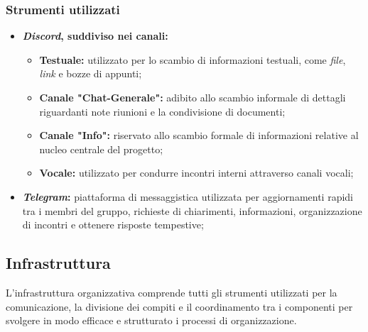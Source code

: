 \documentclass[5pt]{article}
\begin{document}
\subsubsection{Strumenti utilizzati}

\begin{itemize}
	\item \textbf{\textit{\textbf{Discord}}, suddiviso nei canali:}
	\begin{itemize}
		\item \textbf{Testuale:} utilizzato per lo scambio di informazioni testuali, come \textit{file}, \textit{link} e bozze di appunti;
		\item \textbf{Canale "Chat-Generale":} adibito allo scambio informale di dettagli riguardanti note riunioni e la condivisione di documenti;
		\item \textbf{Canale "Info":} riservato allo scambio formale di informazioni relative al nucleo centrale del progetto;
		\item \textbf{Vocale:} utilizzato per condurre incontri interni attraverso canali vocali;
	\end{itemize}
	\item \textbf{\textit{Telegram}:} piattaforma di messaggistica utilizzata per aggiornamenti rapidi tra i membri del gruppo, richieste di chiarimenti, informazioni, organizzazione di incontri e ottenere risposte tempestive;
\end{itemize}

\subsection{Infrastruttura}
L'infrastruttura organizzativa comprende tutti gli strumenti utilizzati per la comunicazione, la divisione dei compiti e il coordinamento tra i componenti per svolgere in modo efficace e strutturato i processi di organizzazione.
\end{document}
